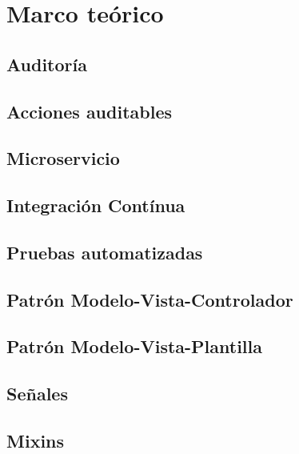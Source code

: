 \chapter{\textbf{Marco teórico}}

\thispagestyle{empty}

\section{Auditoría}
\section{Acciones auditables}
\section{Microservicio}
\section{Integración Contínua}
\section{Pruebas automatizadas}
\section{Patrón Modelo-Vista-Controlador}
\section{Patrón Modelo-Vista-Plantilla}
\section{Señales}
\section{Mixins}




